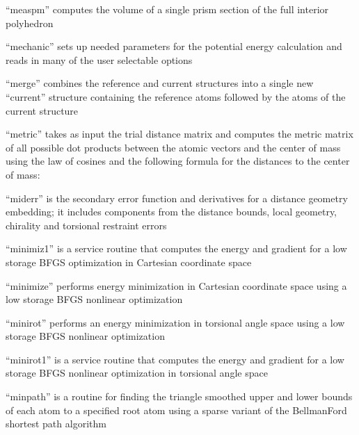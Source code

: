 \documentclass[letterpaper,11pt,english]{sphinxmanual}
\begin{document}
“measpm” computes the volume of a single prism section of
the full interior polyhedron


“mechanic” sets up needed parameters for the potential energy
calculation and reads in many of the user selectable options


“merge” combines the reference and current structures into
a single new “current” structure containing the reference
atoms followed by the atoms of the current structure


“metric” takes as input the trial distance matrix and computes
the metric matrix of all possible dot products between the atomic
vectors and the center of mass using the law of cosines and the
following formula for the distances to the center of mass:


“miderr” is the secondary error function and derivatives
for a distance geometry embedding; it includes components
from the distance bounds, local geometry, chirality and
torsional restraint errors


“minimiz1” is a service routine that computes the energy and
gradient for a low storage BFGS optimization in Cartesian
coordinate space


“minimize” performs energy minimization in Cartesian coordinate
space using a low storage BFGS nonlinear optimization


“minirot” performs an energy minimization in torsional
angle space using a low storage BFGS nonlinear optimization


“minirot1” is a service routine that computes the energy
and gradient for a low storage BFGS nonlinear optimization
in torsional angle space


“minpath” is a routine for finding the triangle smoothed upper
and lower bounds of each atom to a specified root atom using a
sparse variant of the Bellman\sphinxhyphen{}Ford shortest path algorithm
\end{document}

